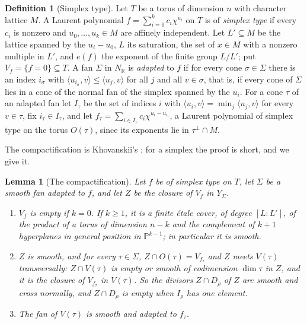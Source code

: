 \documentclass[11pt,reqno]{amsart}
\theoremstyle{plain}
\newtheorem{lemma}[theorem]{Lemma}
\theoremstyle{definition}
\newtheorem{definition}[theorem]{Definition}
\theoremstyle{remark}
\newcommand{\RR}{\mathbb{R}}
\newcommand{\PP}{\mathbb{P}}
\begin{document}
\begin{definition}[Simplex type]\label{def:simplextype}
Let $T$ be a torus of dimension $n$ with character lattice $M$. A Laurent
polynomial $f=\sum_{i=0}^{k}c_{i}\chi^{u_{i}}$ on $T$ is of \emph{simplex
type} if every $c_{i}$ is nonzero and $u_{0},\dots,u_{k}\in M$ are affinely
independent. Let $L'\subseteq M$ be the lattice spanned by the
$u_{i}-u_{0}$, $L$ its saturation, the set of $x\in M$ with a nonzero
multiple in $L'$, and $e(f)$ the exponent of the finite group $L/L'$; put
$V_{f}=\{f=0\}\subseteq T$. A fan $\Sigma$ in $N_{\RR}$ is \emph{adapted} to
$f$ if for every cone $\sigma\in\Sigma$ there is an index $i_{\sigma}$ with
$\langle u_{i_{\sigma}},v\rangle\le\langle u_{j},v\rangle$ for all $j$ and
all $v\in\sigma$, that is, if every cone of $\Sigma$ lies in a cone of the
normal fan of the simplex spanned by the $u_{i}$. For a cone $\tau$ of an
adapted fan let $I_{\tau}$ be the set of indices $i$ with
$\langle u_{i},v\rangle=\min_{j}\langle u_{j},v\rangle$ for every
$v\in\tau$, fix $i_{\tau}\in I_{\tau}$, and let
$f_{\tau}=\sum_{i\in I_{\tau}}c_{i}\chi^{u_{i}-u_{i_{\tau}}}$, a Laurent
polynomial of simplex type on the torus $O(\tau)$, since its exponents lie
in $\tau^{\perp}\cap M$.
\end{definition}

The compactification is Khovanskii's \cite{Kho77}; for a simplex the proof
is short, and we give it.

\begin{lemma}[The compactification]\label{lem:simplexchart}
Let $f$ be of simplex type on $T$, let $\Sigma$ be a smooth fan adapted to
$f$, and let $Z$ be the closure of $V_{f}$ in $Y_{\Sigma}$.
\begin{enumerate}[label=\textup{(\roman*)},leftmargin=2.6em,itemsep=2pt]
\item $V_{f}$ is empty if $k=0$. If $k\ge1$, it is a finite \'etale cover,
  of degree $[L:L']$, of the product of a torus of dimension $n-k$ and the
  complement of $k+1$ hyperplanes in general position in $\PP^{k-1}$; in
  particular it is smooth.
\item $Z$ is smooth, and for every $\tau\in\Sigma$, $Z\cap O(\tau)=V_{f_{\tau}}$
  and $Z$ meets $V(\tau)$ transversally: $Z\cap V(\tau)$ is empty or smooth of
  codimension $\dim\tau$ in $Z$, and it is the closure of $V_{f_{\tau}}$ in
  $V(\tau)$. So the divisors $Z\cap D_{\rho}$ of $Z$ are smooth and cross
  normally, and $Z\cap D_{\rho}$ is empty when $I_{\rho}$ has one element.
\item The fan of $V(\tau)$ is smooth and adapted to $f_{\tau}$.
\end{enumerate}
\end{lemma}
\end{document}
